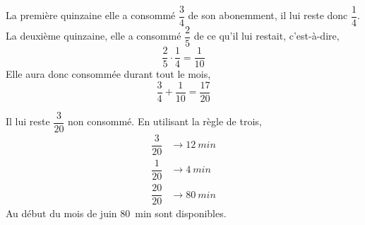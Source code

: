 %
%
    \begin{tasks}
        \task La première quinzaine elle a consommé $\dfrac{3}{4}$ de son
        abonemment, il lui reste donc $\dfrac{1}{4}$. La deuxième quinzaine,
        elle a consommé $\dfrac{2}{5}$ de ce qu'il lui restait, c'est-à-dire,
        \begin{equation*}
            \dfrac{2}{5}\cdot\dfrac{1}{4} = \dfrac{1}{10}
        \end{equation*}
        Elle aura donc consommée durant tout le mois,
        \begin{equation*}
            \dfrac{3}{4} + \dfrac{1}{10} = \dfrac{17}{20}
        \end{equation*}

        \task Il lui reste $\dfrac{3}{20}$ non consommé.
        \task En utilisant la règle de trois,
        \begin{align*}
            \dfrac{3}{20}  & \longrightarrow \SI{12}{min} \\
            \dfrac{1}{20}  & \longrightarrow \SI{4}{min}  \\
            \dfrac{20}{20} & \longrightarrow \SI{80}{min}
        \end{align*}
        Au début du mois de juin \SI{80}{min} sont disponibles.
    \end{tasks}

